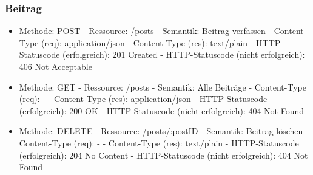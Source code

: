 	\subsubsection{Beitrag}
	\begin{itemize}
	\item Methode: POST\newline
	\noindent\hspace*{10mm} - Ressource: /posts \newline
	\noindent\hspace*{10mm} - Semantik: Beitrag verfassen \newline
	\noindent\hspace*{10mm} - Content-Type (req): application/json \newline
	\noindent\hspace*{10mm} - Content-Type (res): text/plain \newline
	\noindent\hspace*{10mm} - HTTP-Statuscode (erfolgreich): 201 Created \newline
	\noindent\hspace*{10mm} - HTTP-Statuscode (nicht erfolgreich): 406 Not Acceptable
	\item Methode: GET\newline
	\noindent\hspace*{10mm} - Ressource: /posts \newline
	\noindent\hspace*{10mm} - Semantik: Alle Beiträge \newline
	\noindent\hspace*{10mm} - Content-Type (req): - \newline
	\noindent\hspace*{10mm} - Content-Type (res): application/json \newline
	\noindent\hspace*{10mm} - HTTP-Statuscode (erfolgreich): 200 OK \newline
	\noindent\hspace*{10mm} - HTTP-Statuscode (nicht erfolgreich): 404 Not Found
	\item Methode: DELETE\newline
	\noindent\hspace*{10mm} - Ressource: /posts/:postID \newline
	\noindent\hspace*{10mm} - Semantik: Beitrag löschen \newline
	\noindent\hspace*{10mm} - Content-Type (req): - \newline
	\noindent\hspace*{10mm} - Content-Type (res): text/plain \newline
	\noindent\hspace*{10mm} - HTTP-Statuscode (erfolgreich): 204 No Content\newline
	\noindent\hspace*{10mm} - HTTP-Statuscode (nicht erfolgreich): 404 Not Found
	\end{itemize}

